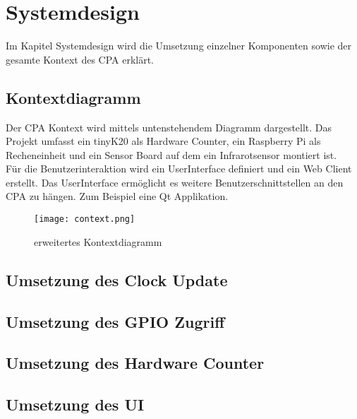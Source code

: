 \section{Systemdesign}
    Im Kapitel Systemdesign wird die Umsetzung einzelner Komponenten sowie der gesamte Kontext des CPA erklärt.
        \subsection{Kontextdiagramm}
        Der CPA Kontext wird mittels untenstehendem Diagramm dargestellt. Das Projekt umfasst ein tinyK20 als Hardware Counter, ein Raspberry Pi als Recheneinheit und ein Sensor Board auf dem ein Infrarotsensor montiert ist.\\
        Für die Benutzerinteraktion wird ein UserInterface definiert und ein Web Client erstellt. Das UserInterface ermöglicht es weitere Benutzerschnittstellen an den CPA zu hängen. Zum Beispiel eine Qt Applikation.
        \begin{figure}[H]
            \centering
            \texttt{[image: context.png]}
            \caption{erweitertes Kontextdiagramm}
        \end{figure}

    	\subsection{Umsetzung des Clock Update} %
		\subsection{Umsetzung des GPIO Zugriff} %
		\subsection{Umsetzung des Hardware Counter} %
        \clearpage
        
        \clearpage
        \subsection{Umsetzung des UI} %
        \clearpage
        
        \clearpage
		